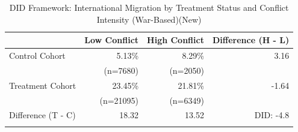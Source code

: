 \begin{table}[!h]
\centering
\caption{\label{tab:tab:did_war}DID Framework: International Migration by Treatment Status and Conflict Intensity (War-Based)(New)}
\centering
\fontsize{10}{12}\selectfont
\begin{tabular}[t]{lrrr}
\toprule
 & Low Conflict & High Conflict & Difference (H - L)\\
\midrule
Control Cohort & 5.13\% & 8.29\% & 3.16 \\
 & (n=7680) & (n=2050) & \\
Treatment Cohort & 23.45\% & 21.81\% & -1.64 \\
 & (n=21095) & (n=6349) & \\
Difference (T - C) & 18.32  & 13.52  & DID: -4.8 \\
\addlinespace
 &  &  & \\
\bottomrule
\end{tabular}
\end{table}